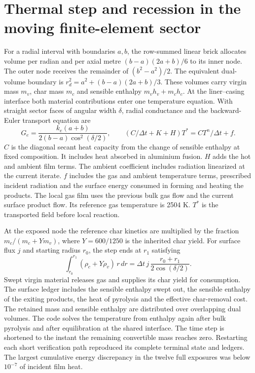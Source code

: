 \section{Thermal step and recession in the moving finite-element sector}
For a radial interval with boundaries $a,b$, the row-summed linear brick
allocates volume per radian and per axial metre $(b-a)(2a+b)/6$ to its inner
node. The outer node receives the remainder of $(b^2-a^2)/2$. The equivalent
dual-volume boundary is $r_d^2=a^2+(b-a)(2a+b)/3$. These volumes carry virgin
mass $m_v$, char mass $m_c$ and sensible enthalpy $m_vh_v+m_ch_c$. At the
liner--casing interface both material contributions enter one temperature equation.
With straight sector faces of angular width $\delta$, radial conductance and the
backward-Euler transport equation are
\[
 G_e=\frac{k_e(a+b)}{2(b-a)\cos^2(\delta/2)},\qquad
 (C/\Delta t+K+H)T^*=C T^n/\Delta t+f.
\]
$C$ is the diagonal secant heat capacity from the change of sensible enthalpy
at fixed composition. It includes heat absorbed in aluminium fusion. $H$ adds
the hot and ambient film terms. The ambient coefficient includes radiation
linearized at the current iterate. $f$ includes the gas and ambient temperature
terms, prescribed incident radiation and the surface energy consumed in
forming and heating the products. The local gas film uses the previous bulk
gas flow and the current surface product flow. Its reference gas temperature
is 2504 K. $T^*$ is the transported field before local reaction.

At the exposed node the reference char kinetics are multiplied by the fraction
$m_c/(m_c+Y m_v)$, where $Y=600/1250$ is the inherited char yield. For surface
flux $j$ and starting radius $r_0$, the step ends at $r_1$ satisfying
\[
 \int_{r_0}^{r_1}(\rho_c+Y\rho_v)\,r\,dr
   = \Delta t\,j\,\frac{r_0+r_1}{2\cos(\delta/2)} .
\]
Swept virgin material releases gas and supplies its char yield for consumption.
The surface ledger includes the sensible enthalpy swept out, the sensible
enthalpy of the exiting products, the heat of pyrolysis and the effective
char-removal cost. The retained mass and sensible enthalpy are distributed
over overlapping dual volumes. The code solves the temperature from enthalpy
again after bulk pyrolysis and after equilibration at the shared interface.
The time step is shortened to the instant the remaining convertible mass
reaches zero. Restarting each short verification path reproduced its complete
terminal state and ledgers. The largest cumulative energy discrepancy in the
twelve full exposures was below $10^{-7}$ of incident film heat.


